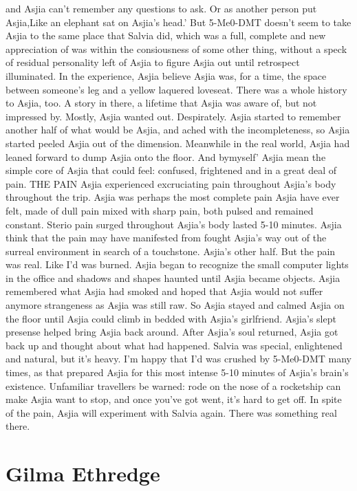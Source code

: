 \documentclass[12pt]{book}
\begin{document}
and Asjia can't remember any questions to ask. Or as another person put Asjia,Like an elephant sat on Asjia's head.' But 5-Me0-DMT doesn't seem to take Asjia to the same place that Salvia did, which was a full, complete and new appreciation of was within the consiousness of some other thing, without a speck of residual personality left of Asjia to figure Asjia out until retrospect illuminated. In the experience, Asjia believe Asjia was, for a time, the space between someone's leg and a yellow laquered loveseat. There was a whole history to Asjia, too. A story in there, a lifetime that Asjia was aware of, but not impressed by. Mostly, Asjia wanted out. Despirately. Asjia started to remember another half of what would be Asjia, and ached with the incompleteness, so Asjia started peeled Asjia out of the dimension. Meanwhile in the real world, Asjia had leaned forward to dump Asjia onto the floor. And bymyself' Asjia mean the simple core of Asjia that could feel: confused, frightened and in a great deal of pain. THE PAIN Asjia experienced excruciating pain throughout Asjia's body throughout the trip. Asjia was perhaps the most complete pain Asjia have ever felt, made of dull pain mixed with sharp pain, both pulsed and remained constant. Sterio pain surged throughout Asjia's body lasted 5-10 minutes. Asjia think that the pain may have manifested from fought Asjia's way out of the surreal environment in search of a touchstone. Asjia's other half. But the pain was real. Like I'd was burned. Asjia began to recognize the small computer lights in the office and shadows and shapes haunted until Asjia became objects. Asjia remembered what Asjia had smoked and hoped that Asjia would not suffer anymore strangeness as Asjia was still raw. So Asjia stayed and calmed Asjia on the floor until Asjia could climb in bedded with Asjia's girlfriend. Asjia's slept presense helped bring Asjia back around. After Asjia's soul returned, Asjia got back up and thought about what had happened. Salvia was special, enlightened and natural, but it's heavy. I'm happy that I'd was crushed by 5-Me0-DMT many times, as that prepared Asjia for this most intense 5-10 minutes of Asjia's brain's existence. Unfamiliar travellers be warned: rode on the nose of a rocketship can make Asjia want to stop, and once you've got went, it's hard to get off. In spite of the pain, Asjia will experiment with Salvia again. There was something real there.



\chapter{Gilma Ethredge}
\end{document}
